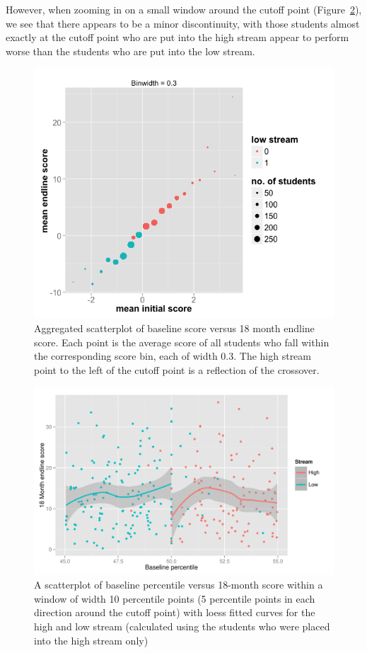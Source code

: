 \documentclass[11pt]{article}
\begin{document}
However, when zooming in on a small window around the cutoff point (Figure~\ref{fig:RD_scatter}), we see that there appears to be a minor discontinuity, with those students almost exactly at the cutoff point who are put into the high stream appear to perform worse than the students who are put into the low stream.

  \begin{figure}[H]
 \centering
 \includegraphics[scale=0.6]{RD_initial.png}
 \caption{Aggregated scatterplot of baseline score versus 18 month endline score. Each point is the average score of all students who fall within the corresponding score bin, each of width 0.3. The high stream point to the left of the cutoff point is a reflection of the crossover.}
 \label{fig:RD_big}
 \end{figure}

  \begin{figure}[H]
 \centering
 \includegraphics[scale=0.6]{RD_scatter.pdf}
 \caption{A scatterplot of baseline percentile versus 18-month score within a window of width 10 percentile points (5 percentile points in each direction around the cutoff point) with loess fitted curves for the high and low stream (calculated using the students who were placed into the high stream only)}
 \label{fig:RD_scatter}
 \end{figure}
\end{document}
